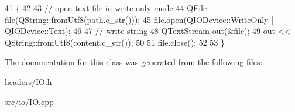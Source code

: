 \begin{DoxyCode}
41                                                              \{
42 
43     \textcolor{comment}{// open text file in write only mode}
44     QFile file(QString::fromUtf8(path.c\_str()));
45     file.open(QIODevice::WriteOnly | QIODevice::Text);
46 
47     \textcolor{comment}{// write string}
48     QTextStream out(&file);
49     out << QString::fromUtf8(content.c\_str());
50 
51     file.close();
52 
53 \}
\end{DoxyCode}


The documentation for this class was generated from the following files\+:\begin{DoxyCompactItemize}
\item 
headers/\hyperlink{IO_8h}{I\+O.\+h}\item 
src/io/I\+O.\+cpp\end{DoxyCompactItemize}
